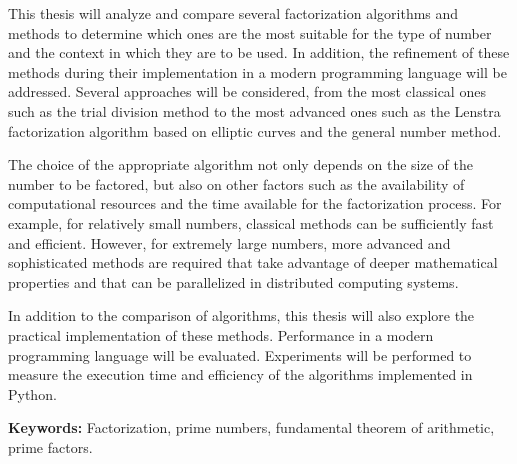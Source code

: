 This thesis will analyze and compare several factorization algorithms and methods to determine which ones are the most suitable for the type of number and the context in which they are to be used. In addition, the refinement of these methods during their implementation in a modern programming language will be addressed. Several approaches will be considered, from the most classical ones such as the trial division method to the most advanced ones such as the Lenstra factorization algorithm based on elliptic curves and the general number method.

The choice of the appropriate algorithm not only depends on the size of the number to be factored, but also on other factors such as the availability of computational resources and the time available for the factorization process. For example, for relatively small numbers, classical methods can be sufficiently fast and efficient. However, for extremely large numbers, more advanced and sophisticated methods are required that take advantage of deeper mathematical properties and that can be parallelized in distributed computing systems.

In addition to the comparison of algorithms, this thesis will also explore the practical implementation of these methods. Performance in a modern programming language will be evaluated. Experiments will be performed to measure the execution time and efficiency of the algorithms implemented in Python.


\textbf{Keywords:} Factorization, prime numbers, fundamental theorem of arithmetic, prime factors.

